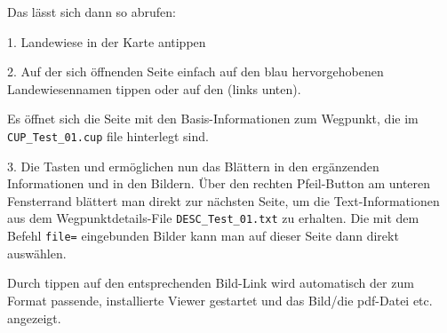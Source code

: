 Das lässt sich dann so abrufen:

1. Landewiese in der Karte antippen


2. Auf der sich öffnenden Seite einfach auf den blau hervorgehobenen Landewiesennamen tippen oder auf den  (links unten).


Es öffnet sich die Seite mit den Basis-Informationen zum Wegpunkt, die im \verb|CUP_Test_01.cup| file hinterlegt sind.


3. Die Tasten \button{$<$} und \button{$>$} ermöglichen nun das Blättern in den ergänzenden Informationen und in den Bildern. Über den rechten Pfeil-Button \button{$>$} am unteren Fensterrand blättert man direkt zur nächsten Seite, um die Text-Informationen aus dem Wegpunktdetails-File \verb|DESC_Test_01.txt| zu erhalten.  
Die mit dem Befehl \verb|file=| eingebunden Bilder kann man auf dieser Seite dann direkt auswählen. 


Durch tippen auf den entsprechenden Bild-Link wird automatisch der zum Format passende, installierte Viewer gestartet und das Bild/die pdf-Datei etc. angezeigt.

